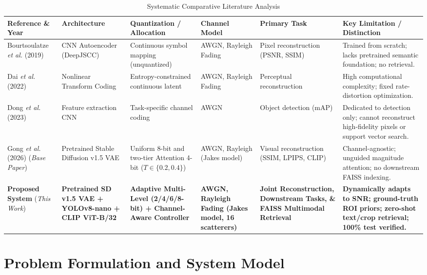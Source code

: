 \documentclass[journal,twocolumn]{IEEEtran}
\begin{document}
\begin{table}[t]
\centering
\caption{Systematic Comparative Literature Analysis}
\label{tab:literature_comparison}
\footnotesize
\begin{tabular}{lp{3.2cm}p{3.2cm}p{2.8cm}p{2.8cm}p{3.0cm}}
\toprule
\textbf{Reference \& Year} & \textbf{Architecture} & \textbf{Quantization / Allocation} & \textbf{Channel Model} & \textbf{Primary Task} & \textbf{Key Limitation / Distinction} \\
\midrule
Bourtsoulatze \textit{et al.} (2019) \cite{bourtsoulatze2019deep} & CNN Autoencoder (DeepJSCC) & Continuous symbol mapping (unquantized) & AWGN, Rayleigh Fading & Pixel reconstruction (PSNR, SSIM) & Trained from scratch; lacks pretrained semantic foundation; no retrieval. \\
\addlinespace
Dai \textit{et al.} (2022) \cite{dai2022nonlinear} & Nonlinear Transform Coding & Entropy-constrained continuous latent & AWGN, Rayleigh Fading & Perceptual reconstruction & High computational complexity; fixed rate-distortion optimization. \\
\addlinespace
Dong \textit{et al.} (2023) \cite{dong2023task} & Feature extraction CNN & Task-specific channel coding & AWGN & Object detection (mAP) & Dedicated to detection only; cannot reconstruct high-fidelity pixels or support vector search. \\
\addlinespace
Gong \textit{et al.} (2026) \cite{gong2026wireless} \newline (\textit{Base Paper}) & Pretrained Stable Diffusion v1.5 VAE & Uniform 8-bit and two-tier Attention 4-bit ($T \in \{0.2, 0.4\}$) & AWGN, Rayleigh (Jakes model) & Visual reconstruction (SSIM, LPIPS, CLIP) & Channel-agnostic; unguided magnitude attention; no downstream FAISS indexing. \\
\addlinespace
\textbf{Proposed System} \newline (\textit{This Work}) & \textbf{Pretrained SD v1.5 VAE + YOLOv8-nano + CLIP ViT-B/32} & \textbf{Adaptive Multi-Level (2/4/6/8-bit) + Channel-Aware Controller} & \textbf{AWGN, Rayleigh Fading (Jakes model, 16 scatterers)} & \textbf{Joint Reconstruction, Downstream Tasks, \& FAISS Multimodal Retrieval} & \textbf{Dynamically adapts to SNR; ground-truth ROI priors; zero-shot text/crop retrieval; 100\% test verified.} \\
\bottomrule
\end{tabular}
\end{table}

\section{Problem Formulation and System Model}
\end{document}
